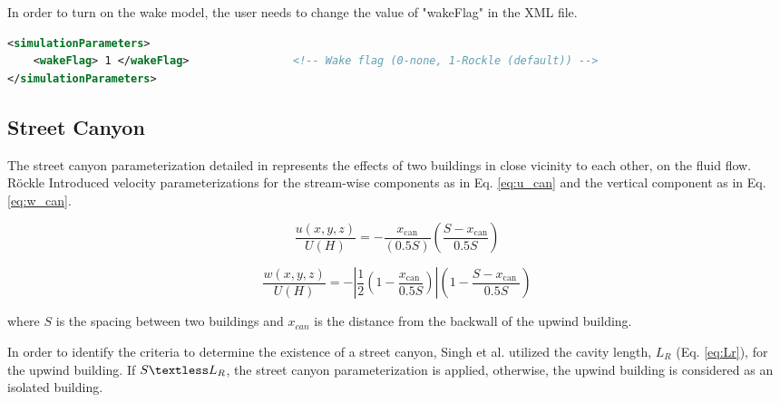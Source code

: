 In order to turn on the wake model, the user needs to change the value of "wakeFlag" in the XML file.

\begin{lstlisting}[language=XML]
<simulationParameters>
  	<wakeFlag> 1 </wakeFlag> 				<!-- Wake flag (0-none, 1-Rockle (default)) -->
</simulationParameters>
\end{lstlisting}

\subsection{Street Canyon}

The street canyon parameterization detailed in \cite{singh2008evaluation} represents the effects of two buildings in close vicinity to each other, on the fluid flow. R\"{o}ckle \cite{rockle1990bestimmung} Introduced velocity parameterizations for the stream-wise components as in Eq. \ref{eq:u_can} and the vertical component as in Eq. \ref{eq:w_can}.

\begin{equation}
\frac{u(x, y, z)}{U(H)}=-\frac{x_{\mathrm{can}}}{(0.5 S)}\left(\frac{S-x_{\mathrm{can}}}{0.5 S}\right)
\label{eq:u_can}
\end{equation}

\begin{equation}
\frac{w(x, y, z)}{U(H)}=-\left|\frac{1}{2}\left(1-\frac{x_{\text {can }}}{0.5 S}\right)\right|\left(1-\frac{S-x_{\text {can }}}{0.5 S}\right)
\label{eq:w_can}
\end{equation}

where $S$ is the spacing between two buildings and $x_{can}$ is the distance from the backwall of the upwind building.

In order to identify the criteria to determine the existence of a street canyon, Singh et al. \cite{singh2008evaluation} utilized the cavity length, $L_R$ (Eq. \ref{eq:Lr}), for the upwind building. If $S \textless L_R$, the street canyon parameterization is applied, otherwise, the upwind building is considered as an isolated building.

